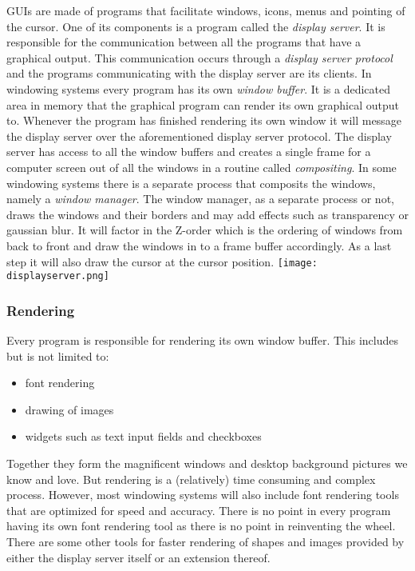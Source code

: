 GUIs are made of programs that facilitate windows, icons, menus and pointing of the cursor. One of 
its components is a program called the \textit{display server}. It is responsible for the communication between
all the programs that have a graphical output. This communication occurs through a \textit{display server protocol}
and the programs communicating with the display server are its clients. In windowing systems every
program has its own \textit{window buffer}. It is a dedicated area in memory that the graphical program can
render its own graphical output to. Whenever the program has finished rendering its own window it will
message the display server over the aforementioned display server protocol. The display server has
access to all the window buffers and creates a single frame for a computer screen out of all the
windows in a routine called \textit{compositing}. In some windowing systems there is a separate process that
composits the windows, namely a \textit{window manager}. The window manager, as a separate process or not,
draws the windows and their borders and may add effects such as transparency or gaussian blur. It will
factor in the Z-order which is the ordering of windows from back to front and draw the windows in to a 
frame buffer accordingly. As a last step it will also draw the cursor at the cursor position.
\texttt{[image: displayserver.png]}

\subsubsection{Rendering}
Every program is responsible for rendering its own window buffer. This includes but is not limited to:
\begin{itemize}
\item font rendering
\item drawing of images
\item widgets such as text input fields and checkboxes
\end{itemize}

Together they form the magnificent windows and desktop background pictures we know and love. But rendering
is a (relatively) time consuming and complex process. However, most windowing systems will also include 
font rendering tools that are optimized for speed and accuracy. There is no point in every program having 
its own font rendering tool as there is no point in reinventing the wheel. There are some other tools for
faster rendering of shapes and images provided by either the display server itself or an extension
thereof.


